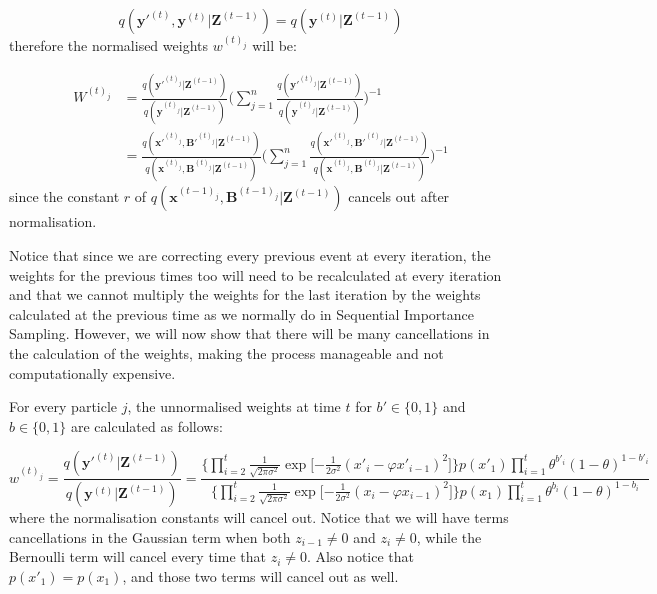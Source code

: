 \documentclass[11pt,a4paper]{article}
\renewcommand{\vec}[1]{\mathbf{#1}}
\begin{document}
\[
q(\vec{y'}^{(t)}, \vec{y}^{(t)} | \vec{Z}^{(t-1)}) = q(\vec{y}^{(t)} | \vec{Z}^{(t-1)})
\]
therefore the normalised weights $w^{(t)_j}$ will be:

\begin{align*}
W^{(t)_j} & = \frac{q(\vec{y'}^{(t)_j} | \vec{Z}^{(t-1)}) }{q(\vec{y}^{(t)_j} | \vec{Z}^{(t-1)})}\Bigg( \sum_{j=1}^n  \frac{q(\vec{y'}^{(t)_j} | \vec{Z}^{(t-1)}) }{q(\vec{y}^{(t)_j} | \vec{Z}^{(t-1)})}\Bigg)^{-1} \\
& = \frac{q(\vec{x'}^{(t)_j}, \vec{B'}^{(t)_j} | \vec{Z}^{(t-1)}) }{q(\vec{x}^{(t)_j}, \vec{B}^{(t)_j} | \vec{Z}^{(t-1)})}\Bigg( \sum_{j=1}^n \frac{q(\vec{x'}^{(t)_j}, \vec{B'}^{(t)_j} | \vec{Z}^{(t-1)}) }{q(\vec{x}^{(t)_j}, \vec{B}^{(t)_j} | \vec{Z}^{(t-1)})}\Bigg)^{-1}
\end{align*}
since the constant $r$ of $q(\vec{x}^{(t-1)_j},\vec{B}^{(t-1)_j} | \vec{Z}^{(t-1)})$ cancels out after normalisation.

Notice that since we are correcting every previous event at every iteration, the weights for the previous times too will need to be recalculated at every iteration and that we cannot multiply the weights for the last iteration by the weights calculated at the previous time as we normally do in Sequential Importance Sampling. However, we will now show that there will be many cancellations in the calculation of the weights, making the process manageable and not computationally expensive.

For every particle $j$, the unnormalised weights at time $t$ for $b' \in \{0,1\}$ and $b \in \{0,1\}$ are calculated as follows:

\[
w^{(t)_j} = \frac{q(\vec{y'}^{(t)} | \vec{Z}^{(t-1)}) }{q(\vec{y}^{(t)} | \vec{Z}^{(t-1)})} = \frac{\bigg \{ \prod_{i=2}^{t}  \frac{1}{\sqrt{2 \pi \sigma^{2}}} \exp \bigg [ { - \frac{1}{2 \sigma^{2}} }  (x'_{i} - \varphi x'_{i-1})^{2} \bigg ] \bigg \} p(x'_{1}) \prod_{i=1}^{t} \theta^{b'_i} (1 - \theta)^{1-b'_{i}}  }{\bigg \{ \prod_{i=2}^{t}  \frac{1}{\sqrt{2 \pi \sigma^{2}}} \exp \bigg [ { - \frac{1}{2 \sigma^{2}} }  (x_{i} - \varphi x_{i-1})^{2} \bigg ] \bigg \} p(x_{1}) \prod_{i=1}^{t} \theta^{b_i} (1 - \theta)^{1-b_{i}} }
\]
where the normalisation constants will cancel out.
Notice that we will have terms cancellations in the Gaussian term when both $z_{i-1} \neq 0$ and $z_{i} \neq 0$, while the Bernoulli term will cancel every time that $z_{i} \neq 0$. Also notice that $p(x'_1) = p(x_1)$, and those two terms will cancel out as well.
\end{document}
